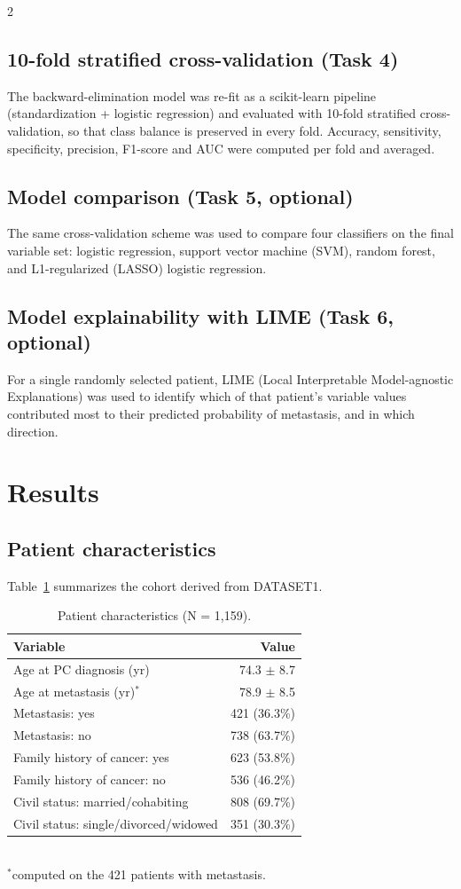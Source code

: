 ﻿\documentclass[a4paper,10pt]{article}
\begin{document}
\begin{multicols*}{2}
\subsection{10-fold stratified cross-validation (Task 4)}
The backward-elimination model was re-fit as a scikit-learn pipeline (standardization + logistic regression) and evaluated with 10-fold stratified cross-validation, so that class balance is preserved in every fold. Accuracy, sensitivity, specificity, precision, F1-score and AUC were computed per fold and averaged.

\subsection{Model comparison (Task 5, optional)}
The same cross-validation scheme was used to compare four classifiers on the final variable set: logistic regression, support vector machine (SVM), random forest, and L1-regularized (LASSO) logistic regression.

\subsection{Model explainability with LIME (Task 6, optional)}
For a single randomly selected patient, LIME (Local Interpretable Model-agnostic Explanations) was used to identify which of that patient's variable values contributed most to their predicted probability of metastasis, and in which direction.

\section{Results}

\subsection{Patient characteristics}
Table~\ref{tab:characteristics} summarizes the cohort derived from DATASET1.

\begin{table}[H]
\centering
\caption{Patient characteristics (N = 1{,}159).}
\label{tab:characteristics}
\begin{tabular}{lr}
\toprule
Variable & Value \\
\midrule
Age at PC diagnosis (yr) & 74.3 $\pm$ 8.7 \\
Age at metastasis (yr)$^{*}$ & 78.9 $\pm$ 8.5 \\
Metastasis: yes & 421 (36.3\%) \\
Metastasis: no & 738 (63.7\%) \\
Family history of cancer: yes & 623 (53.8\%) \\
Family history of cancer: no & 536 (46.2\%) \\
Civil status: married/cohabiting & 808 (69.7\%) \\
Civil status: single/divorced/widowed & 351 (30.3\%) \\
\bottomrule
\end{tabular}\\
\footnotesize{$^{*}$computed on the 421 patients with metastasis.}
\end{table}


\end{multicols*}
\end{document}
